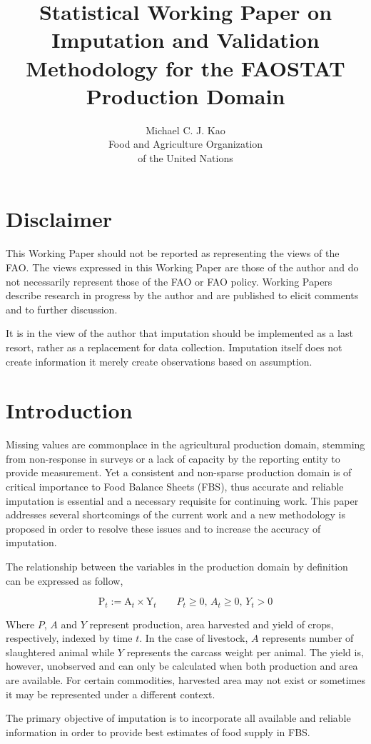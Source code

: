 \documentclass[nojss]{jss}\usepackage[]{graphicx}\usepackage[]{color}
\title{\bf Statistical Working Paper on Imputation and Validation
  Methodology for the FAOSTAT Production Domain}
\author{Michael C. J. Kao\\ Food and Agriculture Organization \\ of
  the United Nations}
\begin{document}
\section*{Disclaimer}
This Working Paper should not be reported as representing the views of
the FAO. The views expressed in this Working Paper are those of the
author and do not necessarily represent those of the FAO or FAO
policy. Working Papers describe research in progress by the author and
are published to elicit comments and to further discussion.

It is in the view of the author that imputation should be implemented
as a last resort, rather as a replacement for data
collection. Imputation itself does not create information it merely
create observations based on assumption. 

\section{Introduction}
Missing values are commonplace in the agricultural production domain,
stemming from non-response in surveys or a lack of capacity by the
reporting entity to provide measurement. Yet a consistent and
non-sparse production domain is of critical importance to Food Balance
Sheets (FBS), thus accurate and reliable imputation is essential and a
necessary requisite for continuing work. This paper addresses several
shortcomings of the current work and a new methodology is proposed in
order to resolve these issues and to increase the accuracy of
imputation.

The relationship between the variables in the production domain by
definition can be expressed as follow,

\begin{equation}
  \label{eq:identity}
  \text{P}_t := \text{A}_t \times \text{Y}_t \quad\quad P_t \ge 0,\, A_t
  \ge 0,\, Y_t > 0
\end{equation}


Where $P$, $A$ and $Y$ represent production, area harvested and yield
of crops, respectively, indexed by time $t$. In the case of livestock,
$A$ represents number of slaughtered animal while $Y$ represents the
carcass weight per animal. The yield is, however, unobserved and can
only be calculated when both production and area are available. For
certain commodities, harvested area may not exist or sometimes it may
be represented under a different context.


The primary objective of imputation is to incorporate all
available and reliable information in order to provide best estimates of
food supply in FBS.
\end{document}
